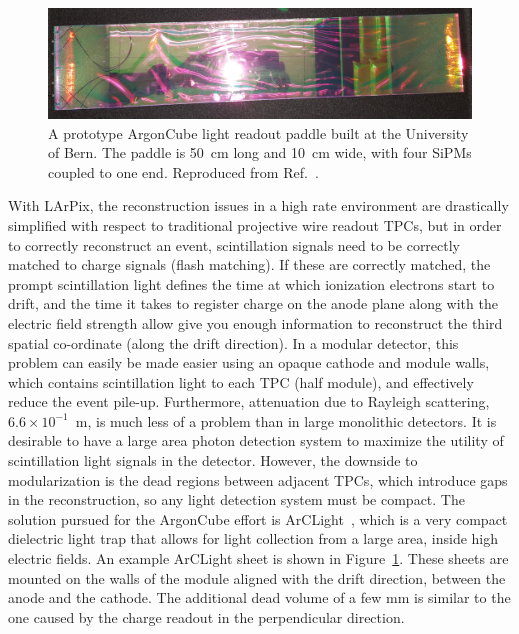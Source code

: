 \begin{figure}[!ht]
\centering
\includegraphics[width=0.75 \linewidth]{plots/1Film50x10.png}
\caption{A prototype ArgonCube light readout paddle built at the University of Bern. The paddle is 50~cm long and 10~cm wide, with four SiPMs coupled to one end. Reproduced from Ref.~\cite{argoncube_loi}.}
\label{fig:arclight}
\end{figure}
With LArPix, the reconstruction issues in a high rate environment are drastically simplified with respect to traditional projective wire readout TPCs, but in order to correctly reconstruct an event, scintillation signals need to be correctly matched to charge signals (flash matching). If these are correctly matched, the prompt scintillation light defines the time at which ionization electrons start to drift, and the time it takes to register charge on the anode plane along with the electric field strength allow give you enough information to reconstruct the third spatial co-ordinate (along the drift direction). In a modular detector, this problem can easily be made easier using an opaque cathode and module walls, which contains scintillation light to each TPC (half module), and effectively reduce the event pile-up. Furthermore, attenuation due to Rayleigh scattering,$6.6\times10^{-1}$~m, is much less of a problem than in large monolithic detectors. It is desirable to have a large area photon detection system to maximize the utility of scintillation light signals in the detector. However, the downside to modularization is the dead regions between adjacent TPCs, which introduce gaps in the reconstruction, so any light detection system must be compact. The solution pursued for the ArgonCube effort is ArCLight~\cite{arclight}, which is a very compact dielectric light trap that allows for light collection from a large area, inside high electric fields. An example ArCLight sheet is shown in Figure~\ref{fig:arclight}. These sheets are mounted on the walls of the module aligned with the drift direction, between the anode and the cathode. The additional dead volume of a few \si{\milli\metre} is similar to the one caused by the charge readout in the perpendicular direction.



